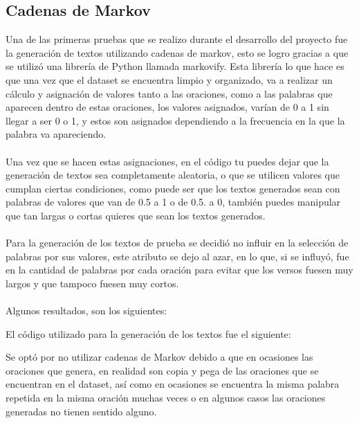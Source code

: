 \documentclass[12pt, a4paper, titlepage]{report}
\begin{document}
	\subsection{Cadenas de Markov}
	Una de las primeras pruebas que se realizo durante el desarrollo del proyecto fue la generación de textos utilizando cadenas de markov, esto se logro gracias a que se utilizó una librería de Python llamada markovify.
	Esta librería lo que hace es que una vez que el dataset se encuentra limpio y organizado, va a realizar un cálculo y asignación de valores tanto a las oraciones, como a las palabras que aparecen dentro de estas oraciones, los valores asignados, varían de 0 a 1 sin llegar a ser 0 o 1, y estos son asignados dependiendo a la frecuencia en la que la palabra va apareciendo.\\\\
	Una vez que se hacen estas asignaciones, en el código tu puedes dejar que la generación de textos sea completamente aleatoria, o que se utilicen valores que cumplan ciertas condiciones, como puede ser que los textos generados sean con palabras de valores que van de 0.5 a 1 o de 0.5. a 0, también puedes manipular que tan largas o cortas quieres que sean los textos generados.\\\\
	Para la generación de los textos de prueba se decidió no influir en la selección de palabras por sus valores, este atributo se dejo al azar, en lo que, si se influyó, fue en la cantidad de palabras por cada oración para evitar que los versos fuesen muy largos y que tampoco fuesen muy cortos.\\\\
	Algunos resultados, son los siguientes:
	\begin{center}
				

	\end{center}
	El código utilizado para la generación de los textos fue el siguiente:
	\begin{center}
		
	\end{center}
	Se optó por no utilizar cadenas de Markov debido a que en ocasiones las oraciones que genera, en realidad son copia y pega de las oraciones que se encuentran en el dataset, así como en ocasiones se encuentra la misma palabra repetida en la misma oración muchas veces o en algunos casos las oraciones generadas no tienen sentido alguno.\\\\
	
\end{document}
